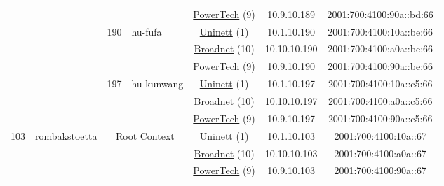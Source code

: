 \begin{small}
\begin{center}
\begin{longtable}{|c|c|c|c|c|c|c|c|}
  &  &  &  & \multicolumn{2}{|c|}{\tiny{\href{http://www.powertech.no}{PowerTech} (9)}} & \tiny{10.9.10.189} & \tiny{2001:700:4100:90a::bd:66} \\* \cline{3-3}\cline{4-4}\cline{5-5}\cline{6-6}\cline{7-7}\cline{8-8}
  &  & \multirow{3}{*}{\tiny{190}} & \multicolumn{1}{|l|}{\multirow{3}{*}{\tiny{hu-fufa}}} & \multicolumn{2}{|c|}{\tiny{\href{https://www.uninett.no}{Uninett} (1)}} & \tiny{10.1.10.190} & \tiny{2001:700:4100:10a::be:66} \\* \cline{5-5}\cline{6-6}\cline{7-7}\cline{8-8}
  &  &  &  & \multicolumn{2}{|c|}{\tiny{\href{https://www.broadnet.no}{Broadnet} (10)}} & \tiny{10.10.10.190} & \tiny{2001:700:4100:a0a::be:66} \\* \cline{5-5}\cline{6-6}\cline{7-7}\cline{8-8}
  &  &  &  & \multicolumn{2}{|c|}{\tiny{\href{http://www.powertech.no}{PowerTech} (9)}} & \tiny{10.9.10.190} & \tiny{2001:700:4100:90a::be:66} \\* \cline{3-3}\cline{4-4}\cline{5-5}\cline{6-6}\cline{7-7}\cline{8-8}
  &  & \multirow{3}{*}{\tiny{197}} & \multicolumn{1}{|l|}{\multirow{3}{*}{\tiny{hu-kunwang}}} & \multicolumn{2}{|c|}{\tiny{\href{https://www.uninett.no}{Uninett} (1)}} & \tiny{10.1.10.197} & \tiny{2001:700:4100:10a::c5:66} \\* \cline{5-5}\cline{6-6}\cline{7-7}\cline{8-8}
  &  &  &  & \multicolumn{2}{|c|}{\tiny{\href{https://www.broadnet.no}{Broadnet} (10)}} & \tiny{10.10.10.197} & \tiny{2001:700:4100:a0a::c5:66} \\* \cline{5-5}\cline{6-6}\cline{7-7}\cline{8-8}
  &  &  &  & \multicolumn{2}{|c|}{\tiny{\href{http://www.powertech.no}{PowerTech} (9)}} & \tiny{10.9.10.197} & \tiny{2001:700:4100:90a::c5:66} \\ \hline
 \multirow{57}{*}{\tiny{103}} & \multicolumn{1}{|l|}{\multirow{57}{*}{\tiny{rombakstoetta}}} & \multicolumn{2}{|c|}{\multirow{3}{*}{\tiny{Root Context}}} & \multicolumn{2}{|c|}{\tiny{\href{https://www.uninett.no}{Uninett} (1)}} & \tiny{10.1.10.103} & \tiny{2001:700:4100:10a::67} \\* \cline{5-5}\cline{6-6}\cline{7-7}\cline{8-8}
  &  & \multicolumn{2}{|c|}{} & \multicolumn{2}{|c|}{\tiny{\href{https://www.broadnet.no}{Broadnet} (10)}} & \tiny{10.10.10.103} & \tiny{2001:700:4100:a0a::67} \\* \cline{5-5}\cline{6-6}\cline{7-7}\cline{8-8}
  &  & \multicolumn{2}{|c|}{} & \multicolumn{2}{|c|}{\tiny{\href{http://www.powertech.no}{PowerTech} (9)}} & \tiny{10.9.10.103} & \tiny{2001:700:4100:90a::67} \\* \cline{3-3}\cline{4-4}\cline{5-5}\cline{6-6}\cline{7-7}\cline{8-8}

\end{longtable}
\end{center}
\end{small}
